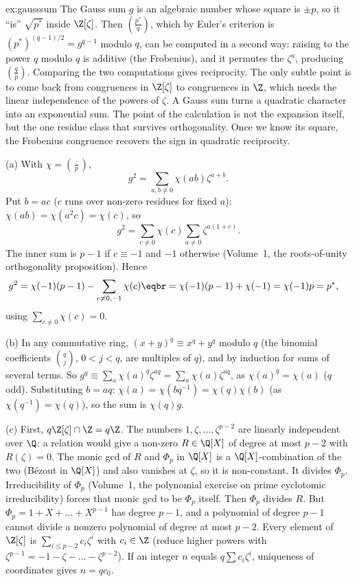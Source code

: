 \begin{solution}{ex:gausssum}
\idea The Gauss sum $g$ is an algebraic number whose square is $\pm p$, so it ``is'' $\sqrt{p^*}$ inside $\Z[\zeta]$. Then $\left(\frac{p^*}q\right)$, which by Euler's criterion is $(p^*)^{(q-1)/2}=g^{q-1}$ modulo $q$, can be computed in a second way: raising to the power $q$ modulo $q$ is additive (the Frobenius), and it permutes the $\zeta^a$, producing $\left(\frac qp\right)$. Comparing the two computations gives reciprocity. The only subtle point is to come back from congruences in $\Z[\zeta]$ to congruences in $\Z$, which needs the linear independence of the powers of $\zeta$.
\writeup
A Gauss sum turns a quadratic character into an exponential sum. The point of the calculation is not the expansion itself, but the one residue class that survives orthogonality. Once we know its square, the Frobenius congruence recovers the sign in quadratic reciprocity.

 (a) With $\chi=\left(\frac\cdot p\right)$,
\[
g^2=\sum_{a,b\ne0}\chi(ab)\zeta^{a+b}.
\] Put $b=ac$ ($c$ runs over non-zero residues for fixed $a$): $\chi(ab)=\chi(a^2c)=\chi(c)$, so
\[g^2=\sum_{c\ne0}\chi(c)\sum_{a\ne0}\zeta^{a(1+c)}.\]
The inner sum is $p-1$ if $c\equiv-1$ and $-1$ otherwise (Volume~1, the roots-of-unity orthogonality proposition). Hence
\[\begin{aligned}g^2&=\chi(-1)(p-1)-\sum_{c\ne0,-1}\chi(c)\eqbr=\chi(-1)(p-1)+\chi(-1)=\chi(-1)p=p^*,\end{aligned}\]
using $\sum_{c\ne0}\chi(c)=0$.

(b) In any commutative ring, $(x+y)^q\equiv x^q+y^q$ modulo $q$ (the binomial coefficients $\binom qj$, $0<j<q$, are multiples of $q$), and by induction for sums of several terms. So $g^q\equiv\sum_a\chi(a)^q\zeta^{aq}=\sum_a\chi(a)\zeta^{aq}$, as $\chi(a)^q=\chi(a)$ ($q$ odd). Substituting $b=aq$: $\chi(a)=\chi(bq^{-1})=\chi(q)\chi(b)$ (as $\chi(q^{-1})=\chi(q)$), so the sum is $\chi(q)g$.

(c) First, $q\Z[\zeta]\cap\Z=q\Z$. The numbers $1,\zeta,\dots,\zeta^{p-2}$ are linearly independent over $\Q$: a relation would give a non-zero $R\in\Q[X]$ of degree at most $p-2$ with $R(\zeta)=0$. The monic gcd of $R$ and $\Phi_p$ in $\Q[X]$ is a $\Q[X]$-combination of the two (B\'ezout in $\Q[X]$) and also vanishes at $\zeta$, so it is non-constant. It divides $\Phi_p$. Irreducibility of $\Phi_p$ (Volume~1, the polynomial exercise on prime cyclotomic irreducibility) forces that monic gcd to be $\Phi_p$ itself. Then $\Phi_p$ divides $R$. But $\Phi_p=1+X+\dots+X^{p-1}$ has degree $p-1$, and a polynomial of degree $p-1$ cannot divide a nonzero polynomial of degree at most $p-2$. Every element of $\Z[\zeta]$ is $\sum_{i\le p-2}c_i\zeta^i$ with $c_i\in\Z$ (reduce higher powers with $\zeta^{p-1}=-1-\zeta-\dots-\zeta^{p-2}$). If an integer $n$ equals $q\sum c_i\zeta^i$, uniqueness of coordinates gives $n=qc_0$.


\end{solution}
